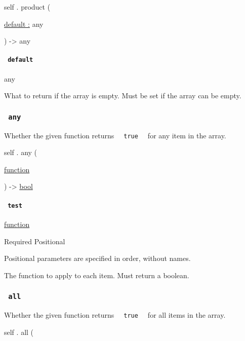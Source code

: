 self { . } { product } (

{ \hyperref[definitions-product-parameters-default]{default :} { any } }

) -\textgreater{} { any }

\paragraph{\texorpdfstring{\texttt{\ default\ }}{ default }}\label{definitions-product-default}

{ any }

What to return if the array is empty. Must be set if the array can be
empty.

\subsubsection{\texorpdfstring{\texttt{\ any\ }}{ any }}\label{definitions-any}

Whether the given function returns
\texttt{\ }{\texttt{\ true\ }}\texttt{\ } for any item in the array.

self { . } { any } (

{ \href{/docs/reference/foundations/function/}{function} }

) -\textgreater{} \href{/docs/reference/foundations/bool/}{bool}

\paragraph{\texorpdfstring{\texttt{\ test\ }}{ test }}\label{definitions-any-test}

\href{/docs/reference/foundations/function/}{function}

{Required} {{ Positional }}

\label{definitions-any-test-positional-tooltip}
Positional parameters are specified in order, without names.

The function to apply to each item. Must return a boolean.

\subsubsection{\texorpdfstring{\texttt{\ all\ }}{ all }}\label{definitions-all}

Whether the given function returns
\texttt{\ }{\texttt{\ true\ }}\texttt{\ } for all items in the array.

self { . } { all } (

